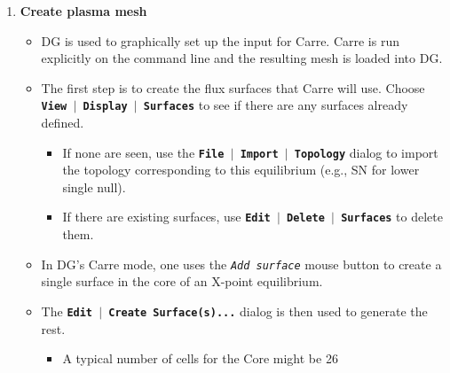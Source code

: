 \documentclass[12pt]{report}
\begin{document}
\begin{enumerate}
\begin{itemize}
    \item Then, use \textbf{\texttt{File \begin{math}\vert{}\end{math} Import \begin{math}\vert{}\end{math} Equilibrium}} to load the new equilibrium
file.
  \end{itemize}
  \item {\bf Create plasma mesh}
  \begin{itemize}
    \item DG is used to graphically set up the input for Carre.  Carre is run 
explicitly on the command line and the resulting mesh is loaded
into DG.
    \item The first step is to create the flux surfaces that Carre will use. 
Choose \textbf{\texttt{View \begin{math}\vert{}\end{math} Display \begin{math}\vert{}\end{math} Surfaces}} to see if there are any surfaces
already defined. 
    \begin{itemize}
      \item If none are seen, use the \textbf{\texttt{File \begin{math}\vert{}\end{math} Import \begin{math}\vert{}\end{math} Topology}} dialog
to import the topology corresponding to this equilibrium (e.g.,
SN for lower single null).
      \item If there are existing surfaces, use \textbf{\texttt{Edit \begin{math}\vert{}\end{math} Delete \begin{math}\vert{}\end{math} Surfaces}} to
delete them.
    \end{itemize}
    \item In DG's Carre mode, one uses the \textit{\texttt{Add surface}} 
mouse button to create a single surface in the core of an X-point 
equilibrium.
    \item The \textbf{\texttt{Edit \begin{math}\vert{}\end{math} Create Surface(s)...}} dialog is then used to generate the rest.
    \begin{itemize}
      \item A typical number of cells for the Core might be 26

\end{itemize}
\end{itemize}
\end{enumerate}
\end{document}
